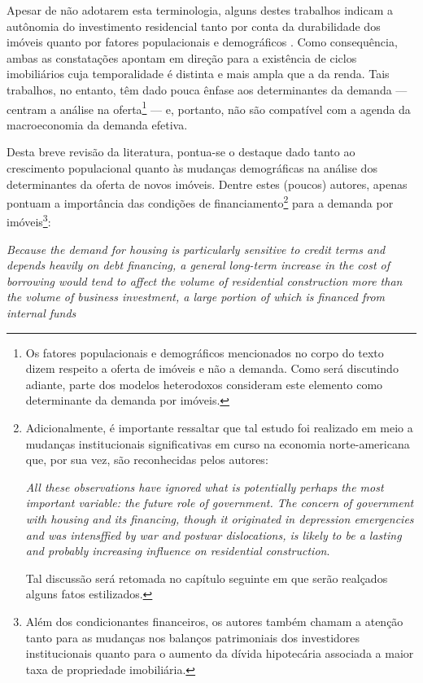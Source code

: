 Apesar de não adotarem esta terminologia, alguns destes trabalhos indicam a autônomia do investimento residencial tanto por conta da durabilidade dos imóveis \cite{derksen_long_1940} quanto por fatores populacionais e demográficos \cites{hansen_economic_1939}{grebler_capital_1956}. Como consequência, ambas as constatações apontam em direção para a existência de ciclos imobiliários cuja temporalidade é distinta e mais ampla que a da renda. 
Tais trabalhos, no entanto, têm dado pouca ênfase aos determinantes da demanda --- centram a análise na oferta\footnote{Os fatores populacionais e demográficos mencionados no corpo do texto dizem respeito a oferta de imóveis e não a demanda. Como será discutindo adiante, parte dos modelos heterodoxos consideram este elemento como determinante da demanda por imóveis.} --- e, portanto, não são compatível com a agenda da macroeconomia da demanda efetiva.

Desta breve revisão da literatura, pontua-se o destaque dado tanto ao crescimento populacional quanto às mudanças demográficas na análise dos determinantes da oferta de novos imóveis.
Dentre estes (poucos) autores, apenas \textcite{grebler_capital_1956} pontuam a importância das condições de financiamento\footnote{
	Adicionalmente, é importante ressaltar que tal estudo foi realizado em meio a mudanças institucionais significativas em curso na economia norte-americana que, por sua vez, são reconhecidas pelos autores:
	\begin{citacao}
		\textit{All these observations have ignored what is potentially perhaps the most important variable: the future role of government. The concern
			of government with housing and its financing, though it originated in
			depression emergencies and was intensffied by war and postwar dislocations, is likely to be a lasting and probably increasing influence on
			residential construction}.
		\cite[p.~27]{grebler_capital_1956}
	\end{citacao}
	Tal discussão será retomada no capítulo seguinte em que serão realçados alguns fatos estilizados.
} para a demanda por imóveis\footnote{Além dos condicionantes financeiros, os autores também chamam a atenção tanto para as mudanças nos balanços patrimoniais dos investidores institucionais quanto para o aumento da dívida hipotecária associada a maior taxa de propriedade imobiliária.
}:
	\begin{citacao}
		\textit{Because the demand for housing is particularly sensitive to credit
		terms and depends heavily on debt financing, a general long-term increase
		in the cost of borrowing would tend to affect the volume of
		residential construction more than the volume of business investment,
		a large portion of which is financed from internal funds}
		\cite[p.~322--3]{grebler_capital_1956}
	\end{citacao}

